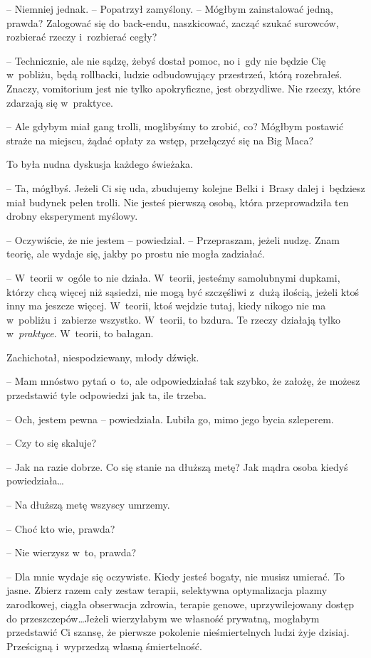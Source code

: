 \documentclass[oneside,polish,11pt,sfheadings]{mwbk}
\begin{document}
-- Niemniej jednak. -- Popatrzył zamyślony. -- Mógłbym zainstalować jedną,
prawda? Zalogować się do back-endu, naszkicować, zacząć szukać surowców,
rozbierać rzeczy i~rozbierać cegły?

-- Technicznie, ale nie sądzę, żebyś dostał pomoc, no i~gdy nie będzie
Cię w~pobliżu, będą rollbacki, ludzie odbudowujący przestrzeń, którą
rozebrałeś. Znaczy, vomitorium jest nie tylko apokryficzne, jest
obrzydliwe. Nie rzeczy, które zdarzają się w~praktyce.

-- Ale gdybym miał gang trolli, moglibyśmy to zrobić, co? Mógłbym
postawić straże na miejscu, żądać opłaty za wstęp, przełączyć się na Big
Maca?

To była nudna dyskusja każdego świeżaka. 

-- Ta, mógłbyś. Jeżeli Ci się
uda, zbudujemy kolejne Belki i~Brasy dalej i~będziesz miał budynek pełen
trolli. Nie jesteś pierwszą osobą, która przeprowadziła ten drobny
eksperyment myślowy.

-- Oczywiście, że nie jestem -- powiedział. -- Przepraszam, jeżeli nudzę.
Znam teorię, ale wydaje się, jakby po prostu nie mogła zadziałać.

-- W~teorii w~ogóle to nie działa. W~teorii, jesteśmy samolubnymi
dupkami, którzy chcą więcej niż sąsiedzi, nie mogą być szczęśliwi z~dużą
ilością, jeżeli ktoś inny ma jeszcze więcej. W~teorii, ktoś wejdzie
tutaj, kiedy nikogo nie ma w~pobliżu i~zabierze wszystko. W~teorii, to
bzdura. Te rzeczy działają tylko w~\textit{praktyce}. W~teorii, to
bałagan.

Zachichotał, niespodziewany, młody dźwięk.

-- Mam mnóstwo pytań o~to, ale odpowiedziałaś tak szybko, że założę, że
możesz przedstawić tyle odpowiedzi jak ta, ile trzeba.

-- Och, jestem pewna -- powiedziała. Lubiła go, mimo jego bycia szleperem.

-- Czy to się skaluje? 

-- Jak na razie dobrze. Co się stanie na dłuższą
metę? Jak mądra osoba kiedyś powiedziała\ldots 

-- Na dłuższą metę wszyscy umrzemy.

-- Choć kto wie, prawda?

-- Nie wierzysz w~to, prawda?

-- Dla mnie wydaje się oczywiste. Kiedy jesteś bogaty, nie musisz
umierać. To jasne. Zbierz razem cały zestaw terapii, selektywna
optymalizacja plazmy zarodkowej, ciągła obserwacja zdrowia, terapie
genowe, uprzywilejowany dostęp do przeszczepów\ldots  Jeżeli wierzyłabym we
własność prywatną, mogłabym przedstawić Ci szansę, że pierwsze pokolenie
nieśmiertelnych ludzi żyje dzisiaj. Prześcigną i~wyprzedzą własną
śmiertelność.
\end{document}
